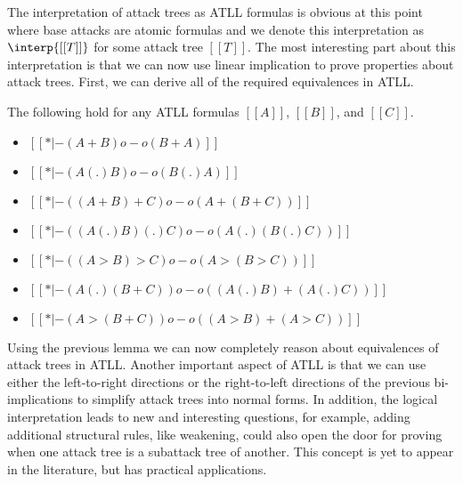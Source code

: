 The interpretation of attack trees as ATLL formulas is obvious at this
point where base attacks are atomic formulas and we denote this
interpretation as $\interp{[[T]]}$ for some attack tree $[[T]]$.  The
most interesting part about this interpretation is that we can now use
linear implication to prove properties about attack trees.  First, we
can derive all of the required equivalences in ATLL.
\begin{lemma}
  \label{lemma:attack_tree_logical_equivalences}
  The following hold for any ATLL formulas $[[A]]$, $[[B]]$, and $[[C]]$.
  \begin{itemize}
  \item $[[* |- (A + B) o-o (B + A)]]$
  \item $[[* |- (A (.) B) o-o (B (.) A)]]$
  \item $[[* |- ((A + B) + C) o-o (A + (B + C))]]$
  \item $[[* |- ((A (.) B) (.) C) o-o (A (.) (B (.) C))]]$
  \item $[[* |- ((A > B) > C) o-o (A > (B > C))]]$
  \item $[[* |- (A (.) (B + C)) o-o ((A (.) B) + (A (.) C))]]$
  \item $[[* |- (A > (B + C)) o-o ((A > B) + (A > C))]]$
  \end{itemize}
\end{lemma}
Using the previous lemma we can now completely reason about
equivalences of attack trees in ATLL.  Another important aspect of
ATLL is that we can use either the left-to-right directions or the
right-to-left directions of the previous bi-implications to simplify
attack trees into normal forms.  In addition, the logical
interpretation leads to new and interesting questions, for example,
adding additional structural rules, like weakening, could also open
the door for proving when one attack tree is a subattack tree of
another.  This concept is yet to appear in the literature, but has
practical applications.

